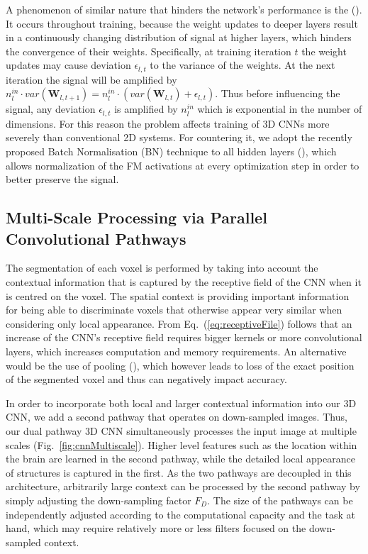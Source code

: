 A phenomenon of similar nature that hinders the network's performance is the  (\cite{ioffe2015batch}). It occurs throughout training, because the weight updates to deeper layers result in a continuously changing distribution of signal at higher layers, which hinders the convergence of their weights. Specifically, at training iteration $t$ the weight updates may cause deviation $\epsilon_{l,t}$ to the variance of the weights. At the next iteration the signal will be amplified by $n^{in}_l \cdot var(\mathbf{W}_{l,t+1}) = n^{in}_l \cdot (var(\mathbf{W}_{l,t}) + \epsilon_{l,t})$. Thus before influencing the signal, any deviation $\epsilon_{l,t}$ is amplified by $n^{in}_l$ which is exponential in the number of dimensions. For this reason the problem affects training of 3D CNNs more severely than conventional 2D systems. For countering it, we adopt the recently proposed Batch Normalisation (BN) technique to all hidden layers (\cite{ioffe2015batch}), which allows normalization of the FM activations at every optimization step in order to better preserve the signal.


\subsection{Multi-Scale Processing via Parallel Convolutional Pathways}
\label{subsec:multiscaleCnn}

The segmentation of each voxel is performed by taking into account the contextual information that is captured by the receptive field of the CNN when it is centred on the voxel. The spatial context is providing important information for being able to discriminate voxels that otherwise appear very similar when considering only local appearance. From Eq.~(\ref{eq:receptiveFile}) follows that an increase of the CNN's receptive field requires bigger kernels or more convolutional layers, which increases computation and memory requirements. An alternative would be the use of pooling (\cite{LeCun1998}), which however leads to loss of the exact position of the segmented voxel and thus can negatively impact accuracy.

In order to incorporate both local and larger contextual information into our 3D CNN, we add a second pathway that operates on down-sampled images. Thus, our dual pathway 3D CNN simultaneously processes the input image at multiple scales (Fig.~\ref{fig:cnnMultiscale}). Higher level features such as the location within the brain are learned in the second pathway, while the detailed local appearance of structures is captured in the first. As the two pathways are decoupled in this architecture, arbitrarily large context can be processed by the second pathway by simply adjusting the down-sampling factor $F_D$. The size of the pathways can be independently adjusted according to the computational capacity and the task at hand, which may require relatively more or less filters focused on the down-sampled context.


